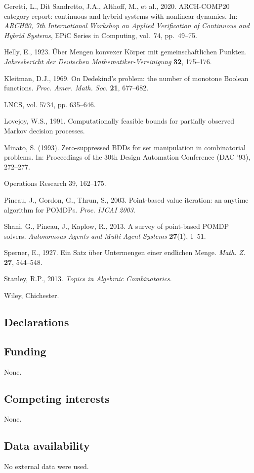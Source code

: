 \documentclass[10pt,twocolumn]{article}
\theoremstyle{plain}
\theoremstyle{definition}
\theoremstyle{remark}
\begin{document}
Geretti, L., Dit Sandretto, J.A., Althoff, M., et al., 2020. ARCH-COMP20 category report:
continuous and hybrid systems with nonlinear dynamics. In: \emph{ARCH20, 7th International
Workshop on Applied Verification of Continuous and Hybrid Systems}, EPiC Series in Computing,
vol.~74, pp.~49--75.

Helly, E., 1923. \"Uber Mengen konvexer K\"orper mit gemeinschaftlichen Punkten.
\emph{Jahresbericht der Deutschen Mathematiker-Vereinigung} \textbf{32}, 175--176.

Kleitman, D.J., 1969. On Dedekind's problem: the number of monotone Boolean functions.
\emph{Proc. Amer. Math. Soc.} \textbf{21}, 677--682.

LNCS, vol. 5734, pp. 635--646.

Lovejoy, W.S., 1991. Computationally feasible bounds for partially
observed Markov decision processes.

Minato, S. (1993). Zero-suppressed BDDs for set manipulation in combinatorial problems. In: Proceedings of the 30th Design Automation Conference (DAC '93), 272--277.

Operations Research 39, 162--175.

Pineau, J., Gordon, G., Thrun, S., 2003. Point-based value iteration: an anytime algorithm
for POMDPs. \emph{Proc. IJCAI 2003}.

Shani, G., Pineau, J., Kaplow, R., 2013. A survey of point-based POMDP solvers.
\emph{Autonomous Agents and Multi-Agent Systems} \textbf{27}(1), 1--51.

Sperner, E., 1927. Ein Satz \"uber Untermengen einer endlichen Menge. \emph{Math. Z.}
\textbf{27}, 544--548.

Stanley, R.P., 2013. \emph{Topics in Algebraic Combinatorics}.

Wiley, Chichester.

\subsection*{Declarations}

\subsection*{Funding}
None.

\subsection*{Competing interests}
None.

\subsection*{Data availability}
No external data were used.
\end{document}
